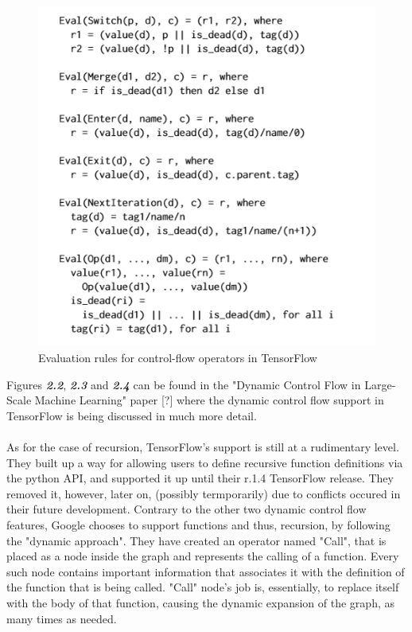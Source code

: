 \documentclass[ack,preface]{dithesis}
\begin{document}
\begin{figure}
\centering
\includegraphics[scale=0.85]{figures/opEval}
\caption{ Evaluation rules for control-flow operators in TensorFlow}
\end{figure}

Figures \textit{\textbf{2.2}}, \textit{\textbf{2.3}} and \textit{\textbf{2.4}} can be found in the "Dynamic Control Flow in Large-Scale Machine Learning" paper [?] where the dynamic control flow support in TensorFlow is being discussed in much more detail. \\\\

As for the case of recursion, TensorFlow's support is still at a rudimentary level. They built up a way for allowing users to define recursive function definitions via the python API,  and supported it up until their r.1.4 TensorFlow release. They removed it, however, later on, (possibly termporarily) due to conflicts occured in their future development. Contrary to the other two dynamic control flow features, Google chooses to support functions and thus, recursion, by following the "dynamic approach".  They have created an operator named "Call", that is placed as a node inside the graph and represents the calling of a function. Every such node contains important information that associates it with the definition  of the function that is being called.  "Call" node's job is, essentially,  to replace itself with the body of that function, causing the dynamic expansion of the graph, as many times as needed. 
\end{document}
